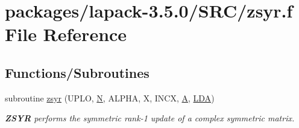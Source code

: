 \hypertarget{zsyr_8f}{}\section{packages/lapack-\/3.5.0/\+S\+R\+C/zsyr.f File Reference}
\label{zsyr_8f}
\subsection*{Functions/\+Subroutines}
\begin{DoxyCompactItemize}
\item 
subroutine \hyperlink{group__complex16SYauxiliary_ga08a5c1ca17a783b2f7e7f3bc80b422dd}{zsyr} (U\+P\+L\+O, \hyperlink{polmisc_8c_a0240ac851181b84ac374872dc5434ee4}{N}, A\+L\+P\+H\+A, X, I\+N\+C\+X, \hyperlink{classA}{A}, \hyperlink{example__user_8c_ae946da542ce0db94dced19b2ecefd1aa}{L\+D\+A})
\begin{DoxyCompactList}\small\item\em {\bfseries Z\+S\+Y\+R} performs the symmetric rank-\/1 update of a complex symmetric matrix. \end{DoxyCompactList}\end{DoxyCompactItemize}
